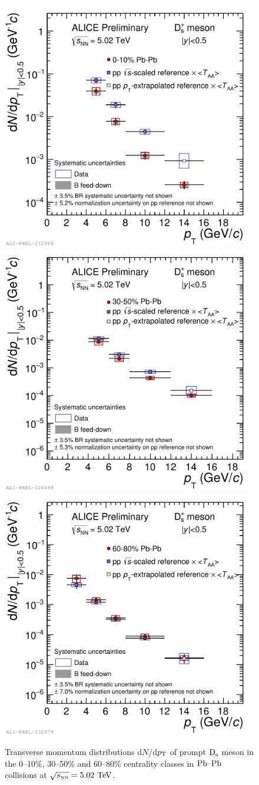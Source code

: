 \begin{figure}[!t]
 \begin{center}
\includegraphics[width=.49\textwidth]{FigCap5/Ds_dNdpt_010.pdf}
\includegraphics[width=.49\textwidth]{FigCap5/Ds_dNdpt_3050.pdf}
\includegraphics[width=.49\textwidth]{FigCap5/Ds_dNdpt_6080.pdf}
 \end{center}
 \caption{Transverse momentum distributions d$N$/d$p_{\rm T}$ of 
prompt ${\rm D_s}$ meson in the 0--10\%, 30--50\% and 60--80\% 
centrality classes in $\mbox{Pb--Pb}$ collisions 
at $\sqrt{s_{\rm \scriptscriptstyle NN}}=5.02~\mathrm{TeV}$. }
 \label{fig:DmesCorrYields010} 
\end{figure} 




